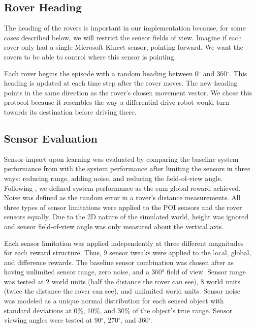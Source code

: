 \documentclass[letterpaper, 10 pt, conference]{ieeeconf}  %
\begin{document}
\subsection{Rover Heading}
The heading of the rovers is important in our implementation because, for some cases described below, we will restrict the sensor fields of view. Imagine if each rover only had a single Microsoft Kinect sensor, pointing forward. We want the rovers to be able to control where this sensor is pointing. 

Each rover begins the episode with a random heading between 0$^{\circ}$ and 360$^{\circ}$. This heading is updated at each time step after the rover moves. The new heading points in the same direction as the rover's chosen movement vector. We chose this protocol because it resembles the way a differential-drive robot would turn towards its destination before driving there. 

\subsection{Sensor Evaluation}
Sensor impact upon learning was evaluated by comparing the baseline
system performance from \cite{agogino2008analyzing} with the system performance after limiting
the sensors in three ways: reducing range, adding noise, and reducing
the field-of-view angle.  Following \cite{agogino2008analyzing}, we defined system performance
as the sum global reward achieved.  Noise was defined as the random
error in a rover’s distance measurements. All three types of sensor
limitations were applied to the POI sensors and the rover sensors
equally. Due to the 2D nature of the simulated world, height was
ignored and sensor field-of-view angle was only measured about the
vertical axis.

Each sensor limitation was applied independently at three different
magnitudes for each reward structure.  Thus, 9 sensor tweaks were applied to
the local, global, and difference rewards. The baseline sensor combination was chosen after \cite{agogino2008analyzing} as having
unlimited sensor range, zero noise, and a 360° field of view. Sensor
range was tested at 2 world units (half the distance the rover can see), 8 world units (twice the distance 
the rover can see), and unlimited world
units. Sensor noise was modeled as a unique normal distribution for
each sensed object with standard deviations at 0\%, 10\%, and 30\% of the
object’s true range. Sensor viewing angles were tested at 90$^{\circ}$, 270$^{\circ}$,
and 360$^{\circ}$.
\end{document}
